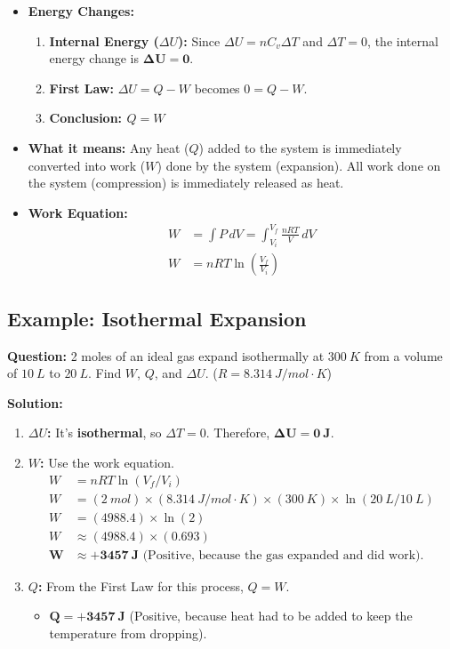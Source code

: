 \documentclass[article]{article}
\begin{document}
\begin{itemize}
    \item \textbf{Energy Changes:}
    \begin{enumerate}
        \item \textbf{Internal Energy ($\Delta U$):} Since $\Delta U = nC_v\Delta T$ and $\Delta T = 0$, the internal energy change is $\mathbf{\Delta U = 0}$.
        \item \textbf{First Law:} $\Delta U = Q - W$ becomes $0 = Q - W$.
        \item \textbf{Conclusion: $Q = W$}
    \end{enumerate}
    \item \textbf{What it means:} Any heat ($Q$) added to the system is immediately converted into work ($W$) done by the system (expansion). All work done on the system (compression) is immediately released as heat.
    \item \textbf{Work Equation:}
    \begin{align*}
        W &= \int P \, dV = \int_{V_i}^{V_f} \frac{nRT}{V} \, dV \\
        W &= nRT \ln\left(\frac{V_f}{V_i}\right)
    \end{align*}
\end{itemize}

\subsection{Example: Isothermal Expansion}
\textbf{Question:} 2 moles of an ideal gas expand isothermally at $\SI{300}{K}$ from a volume of $\SI{10}{L}$ to $\SI{20}{L}$. Find $W$, $Q$, and $\Delta U$. ($R = \SI{8.314}{J/mol\cdot K}$)

\textbf{Solution:}
\begin{enumerate}
    \item \textbf{$\Delta U$:} It's \textbf{isothermal}, so $\Delta T = 0$. Therefore, $\mathbf{\Delta U = \SI{0}{J}}$.
    \item \textbf{$W$:} Use the work equation.
    \begin{align*}
        W &= nRT \ln(V_f / V_i) \\
        W &= (\SI{2}{mol}) \times (\SI{8.314}{J/mol\cdot K}) \times (\SI{300}{K}) \times \ln(\SI{20}{L} / \SI{10}{L}) \\
        W &= (4988.4) \times \ln(2) \\
        W &\approx (4988.4) \times (0.693) \\
        \mathbf{W} &\approx \mathbf{+\SI{3457}{J}} \text{ (Positive, because the gas expanded and did work).}
    \end{align*}
    \item \textbf{$Q$:} From the First Law for this process, $Q = W$.
    \begin{itemize}
        \item $\mathbf{Q = +\SI{3457}{J}}$ (Positive, because heat had to be added to keep the temperature from dropping).
    \end{itemize}
\end{enumerate}
\end{document}
